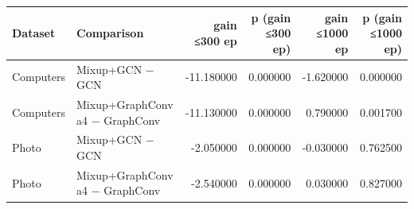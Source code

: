 \begin{tabular}{llrrrr}
\toprule
Dataset & Comparison & gain ≤300 ep & p (gain ≤300 ep) & gain ≤1000 ep & p (gain ≤1000 ep) \\
\midrule
Computers & Mixup+GCN − GCN & -11.180000 & 0.000000 & -1.620000 & 0.000000 \\
Computers & Mixup+GraphConv a4 − GraphConv & -11.130000 & 0.000000 & 0.790000 & 0.001700 \\
Photo & Mixup+GCN − GCN & -2.050000 & 0.000000 & -0.030000 & 0.762500 \\
Photo & Mixup+GraphConv a4 − GraphConv & -2.540000 & 0.000000 & 0.030000 & 0.827000 \\
\bottomrule
\end{tabular}
